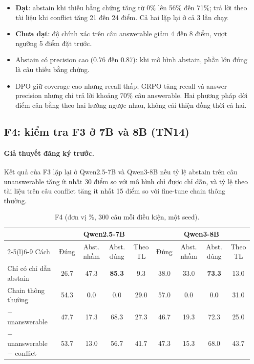 \documentclass[11pt]{article}
\begin{document}
\begin{cachdoc}
\begin{itemize}[leftmargin=*,itemsep=1pt]
\item \textbf{Đạt}: abstain khi thiếu bằng chứng tăng từ 0\% lên 56\% đến 71\%; trả lời theo tài liệu khi
  conflict tăng 21 đến 24 điểm. Cả hai lặp lại ở cả 3 lần chạy.
\item \textbf{Chưa đạt}: độ chính xác trên câu answerable giảm 4 đến 8 điểm, vượt ngưỡng 5 điểm đặt
  trước.
\item Abstain có precision cao (0.76 đến 0.87): khi mô hình abstain, phần lớn đúng là câu thiếu bằng
  chứng.
\item DPO giữ coverage cao nhưng recall thấp; GRPO tăng recall và answer precision nhưng chỉ trả lời khoảng
  70\% câu answerable. Hai phương pháp dời điểm cân bằng theo hai hướng ngược nhau, không cải thiện đồng
  thời cả hai.
\end{itemize}
\end{cachdoc}

\subsection{F4: kiểm tra F3 ở 7B và 8B (TN14)}

\paragraph{Giả thuyết đăng ký trước.} Kết quả của F3 lặp lại ở Qwen2.5-7B và Qwen3-8B nếu tỷ lệ abstain
trên câu unanswerable tăng ít nhất 30 điểm so với mô hình chỉ được chỉ dẫn, và tỷ lệ theo tài liệu trên
câu conflict tăng ít nhất 15 điểm so với fine-tune chain thông thường.

\begin{table}[h]
\centering\footnotesize
\caption{F4 (đơn vị \%, 300 câu mỗi điều kiện, một seed).}
\setlength{\tabcolsep}{3.5pt}
\begin{tabular}{lcccccccc}
\toprule
 & \multicolumn{4}{c}{Qwen2.5-7B} & \multicolumn{4}{c}{Qwen3-8B} \\
\cmidrule(lr){2-5}\cmidrule(l){6-9}
Cách & Đúng & Abst. nhầm & Abst. đúng & Theo TL & Đúng & Abst. nhầm & Abst. đúng & Theo TL \\
\midrule
Chỉ có chỉ dẫn abstain & 26.7 & 47.3 & \textbf{85.3} & 9.3 & 38.0 & 33.0 & \textbf{73.3} & 13.0 \\
Chain thông thường & 54.3 & 0.0 & 0.0 & 29.0 & 57.0 & 0.0 & 0.0 & 31.0 \\
+ unanswerable & 47.7 & 17.3 & 68.3 & 27.3 & 46.7 & 19.3 & 72.3 & 25.0 \\
+ unanswerable + conflict & 53.7 & 13.0 & 56.7 & 41.7 & 47.3 & 15.3 & 68.0 & 43.7 \\
\bottomrule
\end{tabular}
\end{table}
\end{document}
